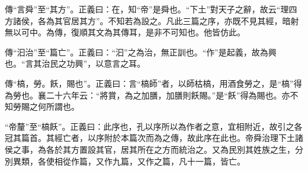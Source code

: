 {\noindent\zhuan{}\fzbyks 傳“言舜”至“其方”。正義曰：在，知“帝”是舜也。“下土”對天子之辭，故云“理四方諸侯，各為其官居其方”。不知若為設之。凡此三篇之序，亦既不見其經，暗射無以可中。為傳，復順其文為其傳耳，是非不可知也。他皆仿此。 \par}

{\noindent\zhuan{}\fzbyks 傳“汩治”至“篇亡”。正義曰：“汩”之為治，無正訓也。“作”是起義，故為興也。“言其治民之功興”，以意言之耳。 \par}

{\noindent\zhuan{}\fzbyks 傳“槁，勞。飫，賜也”。正義曰：言“槁師”者，以師枯槁，用酒食勞之，是“槁”得為勞也。襄二十六年云：“將賞，為之加膳，加膳則飫賜。”是“飫”得為賜也。亦不知勞賜之何所謂也。 \par}

{\noindent\shu{}\fzkt “帝釐”至“槁飫”。正義曰：此序也，孔以序所以為作者之意，宜相附近，故引之各冠其篇首。其經亡者，以序附於本篇次而為之傳，故此序在此也。帝舜治理下土諸侯之事，為各於其方置設其官，居其所在之方而統治之。又為民別其姓族之生，分別異類，各使相從作篇，又作九篇，又作之篇，凡十一篇，皆亡。 \par}

